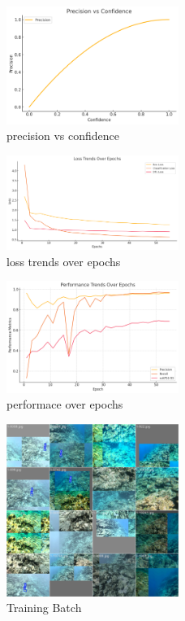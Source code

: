 \documentclass[conference]{IEEEtran}
\begin{document}
\begin{figure}[H]
    \centering
    \includegraphics[width=0.5\textwidth]{P-VS-C.png} 
    \caption{precision vs confidence}
    \label{fig:metadata-schema}
\end{figure}
\begin{figure}[H]
    \centering
    \includegraphics[width=0.5\textwidth]{loss trends over epochs.png} 
    \caption{loss trends over epochs}
    \label{fig:metadata-schema}
\end{figure}

\begin{figure}[H]
    \centering
    \includegraphics[width=0.5\textwidth]{performace over epochs.png} 
    \caption{performace over epochs}
    \label{fig:metadata-schema}
\end{figure}

\begin{figure}[H]
    \centering
    \includegraphics[width=0.5\textwidth]{train_batch1.jpg} 
    \caption{Training Batch}
    \label{fig:metadata-schema}
\end{figure}
\end{document}
